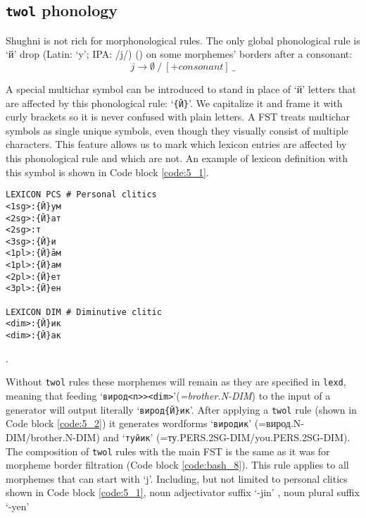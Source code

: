\subsection{\texttt{twol} phonology}
Shughni is not rich for morphonological rules. The only global phonological rule is `й' drop (Latin: `y'; IPA: /j/) () on some morphemes' borders after a consonant:
\[
j \rightarrow \emptyset 
\ /\ 
[+consonant]
\ \_
\]


A special multichar symbol can be introduced to stand in place of `й' letters that are affected by this phonological rule: `\texttt{\{Й\}}'. We capitalize it and frame it with curly brackets so it is never confused with plain letters. A FST treats multichar symbols as single unique symbols, even though they visually consist of multiple characters. This feature allows us to mark which lexicon entries are affected by this phonological rule and which are not. An example of lexicon definition with this symbol is shown in Code block \ref{code:5_1}.

\begin{code_frame}[float]
    \begin{footnotesize}\codespacing
    \begin{verbatim}
LEXICON PCS # Personal clitics
<1sg>:{Й}ум
<2sg>:{Й}ат
<2sg>:т
<3sg>:{Й}и
<1pl>:{Й}āм
<1pl>:{Й}ам
<2pl>:{Й}ет
<3pl>:{Й}ен

LEXICON DIM # Diminutive clitic
<dim>:{Й}ик
<dim>:{Й}ак
    \end{verbatim}
    \end{footnotesize}
    \tcblower
    \label{code:5_1}
\end{code_frame}

.

Without \texttt{twol} rules these morphemes will remain as they are specified in \texttt{lexd}, meaning that feeding `\texttt{вирод<n>><dim>}'(\textit{=brother.N-DIM}) to the input of a generator will output literally `\texttt{вирод\{Й\}ик}'. After applying a \texttt{twol} rule (shown in Code block \ref{code:5_2}) it generates wordforms `\texttt{виродик}' (=вирод.N-DIM/brother.N-DIM) and `\texttt{туйик}' (=ту.PERS.2SG-DIM/you.PERS.2SG-DIM). The composition of \texttt{twol} rules with the main FST is the same as it was for morpheme border filtration (Code block \ref{code:bash_8}). This rule applies to all morphemes that can start with `j'. Including, but not limited to personal clitics shown in Code block \ref{code:5_1}, noun adjectivator suffix `-jin' \parencite[168]{parker_shughni_2023}, noun plural suffix `-yen'

